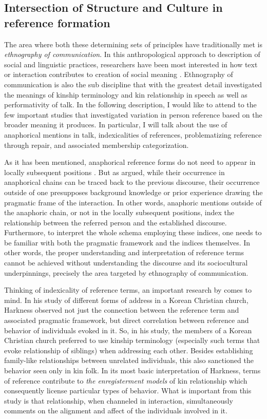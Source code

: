 \documentclass[12pt, draft]{article}
\begin{document}
\subsection{Intersection of Structure and Culture in reference formation}
The area where both these determining sets of principles have traditionally met is \textit{ethnography of communication}. In this anthropological approach to description of social and linguistic practices, researchers have been most interested in how text or interaction contributes to creation of social meaning \parencite{hymes1989}. Ethnography of communication is also the sub discipline that with the greatest detail investigated the meanings of kinship terminology and kin relationship in speech as well as performativity of talk. In the following description, I would like to attend to the few important studies that investigated variation in person reference based on the broader meaning it produces. In particular, I will talk about the use of anaphorical mentions in talk, indexicalities of references, problematizing reference through repair, and associated membership categorization. 

As it has been mentioned, anaphorical reference forms do not need to appear in locally subsequent positions \parencite{schegloff1996}. But as \textcite{hanks2007} argued, while their occurrence in anaphorical chains can be traced back to the previous discourse, their occurrence outside of one presupposes background knowledge or prior experience drawing the pragmatic frame of the interaction. In other words, anaphoric mentions outside of the anaphoric chain, or not in the locally subsequent positions, index the relationship between the referred person and the established discourse. Furthermore, to interpret the whole schema employing these indices, one needs to be familiar with both the pragmatic framework and the indices themselves. In other words, the proper understanding and interpretation of reference terms cannot be achieved without understanding the discourse and its sociocultural underpinnings, precisely the area targeted by ethnography of communication.

Thinking of indexicality of reference terms, an important research by \textcite{harkness2015} comes to mind. In his study of different forms of address in a Korean Christian church, Harkness observed not just the connection between the reference term and associated pragmatic framework, but direct correlation between reference and behavior of individuals evoked in it. So, in his study, the members of a Korean Christian church preferred to use kinship terminology (especially such terms that evoke relationship of siblings) when addressing each other. Besides establishing family-like relationships between unrelated individuals, this also sanctioned the behavior seen only in kin folk. In its most basic interpretation of Harkness, terms of reference contribute to \textit{the enregisterment models} of kin relationship which consequently license particular types of behavior. What is important from this study is that relationship, when channeled in interaction, simultaneously comments on the alignment and affect of the individuals involved in it. 
\end{document}
